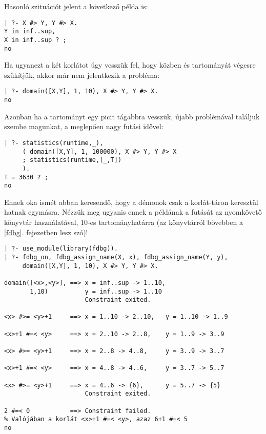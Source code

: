 Hasonló szituációt jelent a következő példa is:

\begin{verbatim}
| ?- X #> Y, Y #> X.
Y in inf..sup,
X in inf..sup ? ;
no
\end{verbatim}

Ha ugyanezt a két korlátot úgy vesszük fel, hogy közben  és  tartományát
végesre szűkítjük, akkor már nem jelentkezik a probléma:

\begin{verbatim}
| ?- domain([X,Y], 1, 10), X #> Y, Y #> X.
no
\end{verbatim}

Azonban ha a tartományt egy picit tágabbra vesszük, újabb problémával találjuk
szembe magunkat, a meglepően nagy futási idővel:

\begin{verbatim}
| ?- statistics(runtime,_),
     ( domain([X,Y], 1, 100000), X #> Y, Y #> X
     ; statistics(runtime,[_,T])
     ).
T = 3630 ? ;
no
\end{verbatim}

Ennek oka ismét abban keresendő, hogy a démonok csak a korlát-táron keresztül
hatnak egymásra. Nézzük meg ugyanis ennek a példának a futását az \fdbg
nyomkövető könyvtár használatával, 10-es tartományhatárra (az \fdbg könyvtárról
bővebben a \ref{fdbg}. fejezetben lesz szó)!

\begin{verbatim}
| ?- use_module(library(fdbg)).
| ?- fdbg_on, fdbg_assign_name(X, x), fdbg_assign_name(Y, y),
     domain([X,Y], 1, 10), X #> Y, Y #> X.

domain([<x>,<y>], ==> x = inf..sup -> 1..10,     
       1,10)          y = inf..sup -> 1..10
                      Constraint exited.
                  
<x> #>= <y>+1     ==> x = 1..10 -> 2..10,   y = 1..10 -> 1..9
                                            
<x>+1 #=< <y>     ==> x = 2..10 -> 2..8,    y = 1..9 -> 3..9
                                            
<x> #>= <y>+1     ==> x = 2..8 -> 4..8,     y = 3..9 -> 3..7
                                            
<x>+1 #=< <y>     ==> x = 4..8 -> 4..6,     y = 3..7 -> 5..7
                                            
<x> #>= <y>+1     ==> x = 4..6 -> {6},      y = 5..7 -> {5} 
                      Constraint exited.
                  
2 #=< 0           ==> Constraint failed.
% Valójában a korlát <x>+1 #=< <y>, azaz 6+1 #=< 5
no
\end{verbatim}

